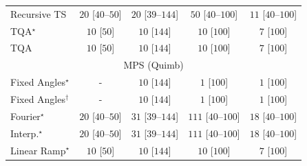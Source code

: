 \begin{tabular}{l|cccc|}
Recursive TS & {\cellcolor[HTML]{F4FBF1}} \color[HTML]{000000} $20$ [$40$--$50$] & {\cellcolor[HTML]{F4FBF1}} \color[HTML]{000000} $20$ [$39$--$144$] & {\cellcolor[HTML]{EEF8EA}} \color[HTML]{000000} $50$ [$40$--$100$] & {\cellcolor[HTML]{F5FBF3}} \color[HTML]{000000} $11$ [$40$--$100$] \\
TQA$^\star$ & {\cellcolor[HTML]{F6FCF4}} \color[HTML]{000000} $10$ [$50$] & {\cellcolor[HTML]{F6FCF4}} \color[HTML]{000000} $10$ [$144$] & {\cellcolor[HTML]{F6FCF4}} \color[HTML]{000000} $10$ [$100$] & {\cellcolor[HTML]{F6FCF4}} \color[HTML]{000000} $7$ [$100$] \\
TQA & {\cellcolor[HTML]{F6FCF4}} \color[HTML]{000000} $10$ [$50$] & {\cellcolor[HTML]{F6FCF4}} \color[HTML]{000000} $10$ [$144$] & {\cellcolor[HTML]{F6FCF4}} \color[HTML]{000000} $10$ [$100$] & {\cellcolor[HTML]{F6FCF4}} \color[HTML]{000000} $7$ [$100$] \\
\cline{1-5}
\multicolumn{5}{c}{\rule{0pt}{8pt}MPS (Quimb)} \\
\midrule
Fixed Angles$^\star$ & {\cellcolor[HTML]{000000}} \color[HTML]{F1F1F1} {\cellcolor{white}} \color{black} - & {\cellcolor[HTML]{F6FCF4}} \color[HTML]{000000} $10$ [$144$] & {\cellcolor[HTML]{F7FCF5}} \color[HTML]{000000} $1$ [$100$] & {\cellcolor[HTML]{F7FCF5}} \color[HTML]{000000} $1$ [$100$] \\
Fixed Angles$^\dagger$ & {\cellcolor[HTML]{000000}} \color[HTML]{F1F1F1} {\cellcolor{white}} \color{black} - & {\cellcolor[HTML]{F6FCF4}} \color[HTML]{000000} $10$ [$144$] & {\cellcolor[HTML]{F7FCF5}} \color[HTML]{000000} $1$ [$100$] & {\cellcolor[HTML]{F7FCF5}} \color[HTML]{000000} $1$ [$100$] \\
Fourier$^\star$ & {\cellcolor[HTML]{F4FBF1}} \color[HTML]{000000} $20$ [$40$--$50$] & {\cellcolor[HTML]{F2FAEF}} \color[HTML]{000000} $31$ [$39$--$144$] & {\cellcolor[HTML]{E1F3DC}} \color[HTML]{000000} $111$ [$40$--$100$] & {\cellcolor[HTML]{F4FBF2}} \color[HTML]{000000} $18$ [$40$--$100$] \\
Interp.$^\star$ & {\cellcolor[HTML]{F4FBF1}} \color[HTML]{000000} $20$ [$40$--$50$] & {\cellcolor[HTML]{F2FAEF}} \color[HTML]{000000} $31$ [$39$--$144$] & {\cellcolor[HTML]{E1F3DC}} \color[HTML]{000000} $111$ [$40$--$100$] & {\cellcolor[HTML]{F4FBF2}} \color[HTML]{000000} $18$ [$40$--$100$] \\
Linear Ramp$^\star$ & {\cellcolor[HTML]{F6FCF4}} \color[HTML]{000000} $10$ [$50$] & {\cellcolor[HTML]{F6FCF4}} \color[HTML]{000000} $10$ [$144$] & {\cellcolor[HTML]{F6FCF4}} \color[HTML]{000000} $10$ [$100$] & {\cellcolor[HTML]{F6FCF4}} \color[HTML]{000000} $7$ [$100$] \\

\end{tabular}
